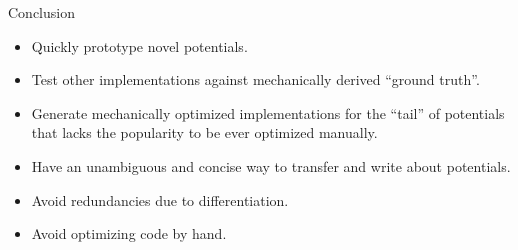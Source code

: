 \begin{frame}[fragile]{}
\begin{columns}[onlytextwidth]
\begin{column}{26.02cm}
\begin{block}{Conclusion}
\begin{minipage}{24.02cm}
\vspace*{.5em}
\begin{itemize}
\item Quickly prototype novel potentials.
\item Test other implementations against mechanically derived ``ground truth''.
\item Generate mechanically optimized implementations for the ``tail'' of potentials that lacks the popularity to be ever optimized manually.
\item Have an unambiguous and concise way to transfer and write about potentials.
\item Avoid redundancies due to differentiation.
\item Avoid optimizing code by hand.
\end{itemize}
\end{minipage}
\end{block}
%
\end{column}%
%
\end{columns}%
%
\end{frame}


